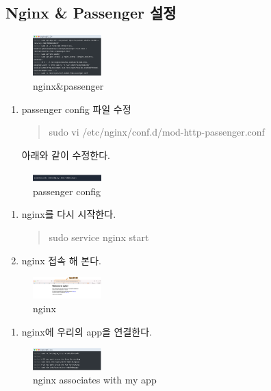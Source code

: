 \documentclass[11pt]{article}
\begin{document}
\subsection{Nginx \& Passenger 설정}
\label{sec:org2da7c0c}
\begin{figure}[htbp]
\centering
\includegraphics[width=100px]{./img/nginx.png}
\caption{\label{fig:org0726c6e}nginx\&passenger}
\end{figure}

\begin{enumerate}
\item passenger config 파일 수정
\begin{quote}
sudo vi /etc/nginx/conf.d/mod-http-passenger.conf
\end{quote}
아래와 같이 수정한다.
\end{enumerate}
\begin{figure}[htbp]
\centering
\includegraphics[width=100px]{./img/pruby.png}
\caption{\label{fig:org7553984}passenger config}
\end{figure}

\begin{enumerate}
\item nginx를 다시 시작한다.
\begin{quote}
sudo service nginx start
\end{quote}
\item nginx 접속 해 본다.
\end{enumerate}
\begin{figure}[htbp]
\centering
\includegraphics[width=100px]{./img/nginx2.png}
\caption{\label{fig:org766bc85}nginx}
\end{figure}

\begin{enumerate}
\item nginx에 우리의 app을 연결한다.
\end{enumerate}
\begin{figure}[htbp]
\centering
\includegraphics[width=100px]{./img/nginx3.png}
\caption{\label{fig:orgadc9404}nginx associates with my app}
\end{figure}
\end{document}
